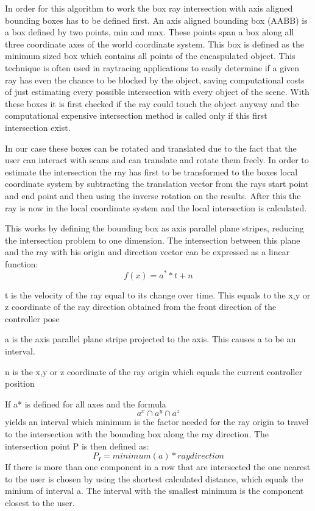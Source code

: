 \documentclass[hyperref,english,bachelorofscience,bibnum,twoside]{cgvpub}
\begin{document}
In order for this algorithm to work the box ray intersection with axis aligned bounding boxes has to be defined first.
An axis aligned bounding box (AABB) is a box defined by two points, min and max. These points span a box along all three coordinate axes of the world coordinate system. This box is defined as the minimum sized box which contains all points of the encaspulated object. This technique is often used in raytracing applications to easily determine if a given ray has even the chance to be blocked by the object, saving computational costs of just estimating every possible intersection with every object of the scene. With these boxes it is first checked if the ray could touch the object anyway and the computational expensive intersection method is called only if this first intersection exist.

In our case these boxes can be rotated and translated due to the fact that the user can interact with scans and can translate and rotate them freely. In order to estimate the intersection the ray has first to be transformed to the boxes local coordinate system by subtracting the translation vector from the rays start point and end point and then using the inverse rotation on the results.
After this the ray is now in the local coordinate system and the local intersection is calculated.

This works by defining the bounding box as axis parallel plane stripes, reducing the intersection problem to one dimension. The intersection between this plane and the ray with his origin and direction vector can be expressed as a linear function:
\[
 f(x) = a^* * t + n
\]

t is the velocity of the ray equal to its change over time. This equals to the x,y or z coordinate of the ray direction obtained from the front direction of the controller pose

a is the axis parallel plane stripe projected to the axis. This causes a to be an interval.

n is the x,y or z coordinate of the ray origin which equals the current controller position

If a* is defined for all axes and the formula 
\[
a^x \cap a^y \cap a^z
\]
yields an interval which minimum is the factor needed for the ray origin to travel to the intersection with the bounding box along the ray direction.
The intersection point P is then defined as:
\[
P_I = minimum(a) * raydirection
\]
If there is more than one component in a row that are intersected the one nearest to the user is chosen by using the shortest calculated distance, which equals the minium of interval a. The interval with the smallest minimum is the component closest to the user.
\end{document}
